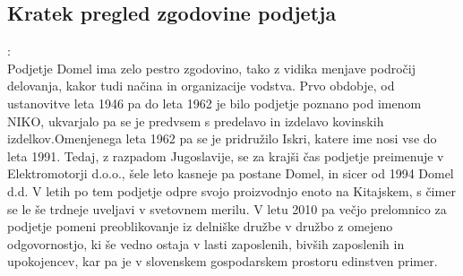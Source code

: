 \documentclass[12pt,a4paper]{amsart}
\theoremstyle{definition} %
\theoremstyle{plain} %
\begin{document}
\subsection{Kratek pregled zgodovine podjetja}:\\
Podjetje Domel ima zelo pestro zgodovino, tako z vidika menjave področij delovanja, kakor tudi načina in organizacije vodstva. Prvo obdobje, od ustanovitve leta 1946 pa do leta 1962 je bilo podjetje poznano pod imenom NIKO, ukvarjalo pa se je predvsem s predelavo in izdelavo kovinskih izdelkov.Omenjenega leta 1962 pa se je pridružilo Iskri, katere ime nosi vse do leta 1991. Tedaj, z razpadom Jugoslavije, se za krajši čas podjetje preimenuje v Elektromotorji d.o.o., šele leto kasneje pa postane Domel, in sicer od 1994 Domel d.d. V letih po tem podjetje odpre svojo proizvodnjo enoto na Kitajskem, s čimer se le še trdneje uveljavi v svetovnem merilu. V letu 2010 pa večjo prelomnico za podjetje pomeni preoblikovanje iz delniške družbe v družbo z omejeno odgovornostjo, ki še vedno ostaja v lasti zaposlenih, bivših zaposlenih in upokojencev, kar pa je v slovenskem gospodarskem prostoru edinstven primer.
\end{document}
